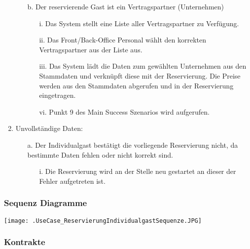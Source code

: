 \documentclass[./detailed_overview_usecases.tex]{subfiles}
\begin{document}
\begin{enumerate}
\begin{itemize}
            \item[b.] Der reservierende Gast ist ein Vertragspartner (Unternehmen)
                \begin{itemize}
                    \item[i.] Das System stellt eine Liste aller Vertragspartner zu Verfügung.
                    \item[ii.] Das Front/Back-Office Personal wählt den korrekten Vertragspartner aus der Liste aus.
                    \item[iii.] Das System lädt die Daten zum gewählten Unternehmen aus den Stammdaten und verknüpft diese mit der Reservierung. Die Preise
                    werden aus den Stammdaten abgerufen und in der Reservierung eingetragen.
                    \item[vi.] Punkt 9 des Main Success Szenarios wird aufgerufen.
                \end{itemize}
        \end{itemize}
        \setcounter{enumi}{8}
        \item Unvollständige Daten: \begin{itemize}
                                        \item[a.] Der Individualgast bestätigt die vorliegende Reservierung nicht, da bestimmte Daten fehlen oder nicht korrekt sind.
                                        \begin{itemize}
                                            \item[i.] Die Reservierung wird an der Stelle neu gestartet an dieser der Fehler aufgetreten ist.
                                        \end{itemize}
                                    \end{itemize}
    \end{enumerate}

    \subsubsection{Sequenz Diagramme}
    \texttt{[image: .UseCase\_ReservierungIndividualgastSequenze.JPG]}
    \subsubsection{Kontrakte}
\end{document}
